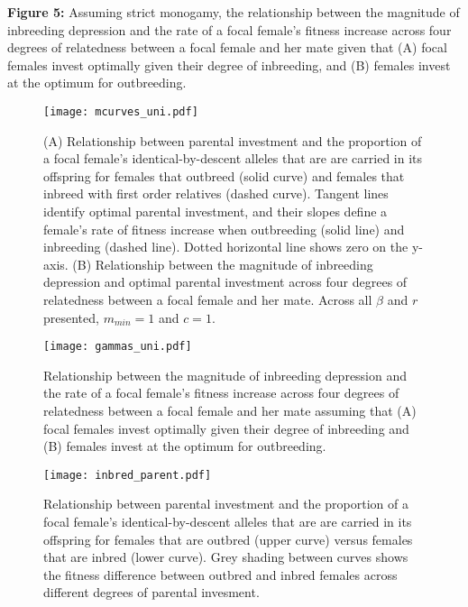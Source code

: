 \documentclass[12pt]{article}
\begin{document}
\noindent \textbf{Figure 5:} Assuming strict monogamy, the relationship between the magnitude of inbreeding depression and the rate of a focal female's fitness increase across four degrees of relatedness between a focal female and her mate given that (A) focal females invest optimally given their degree of inbreeding, and (B) females invest at the optimum for outbreeding. \\


\clearpage
\begin{figure}
\begin{center}				
\texttt{[image: mcurves\_uni.pdf]}
\end{center}
\caption{(A) Relationship between parental investment and the proportion of a focal female's identical-by-descent alleles that are are carried in its offspring for females that outbreed (solid curve) and females that inbreed with first order relatives (dashed curve). Tangent lines identify optimal parental investment, and their slopes define a female's rate of fitness increase when outbreeding (solid line) and inbreeding (dashed line). Dotted horizontal line shows zero on the y-axis. (B) Relationship between the magnitude of inbreeding depression and optimal parental investment across four degrees of relatedness between a focal female and her mate. Across all $\beta$ and $r$ presented, $m_{min}=1$ and $c=1$.}
\label{mcurves_uni}
\end{figure}


\clearpage
\begin{figure}
\begin{center}				
\texttt{[image: gammas\_uni.pdf]}
\end{center}
\caption{Relationship between the magnitude of inbreeding depression and the rate of a focal female's fitness increase across four degrees of relatedness between a focal female and her mate assuming that (A) focal females invest optimally given their degree of inbreeding and (B) females invest at the optimum for outbreeding.}
\label{gammas_uni}
\end{figure}


\clearpage
\begin{figure}
\begin{center}				
\texttt{[image: inbred\_parent.pdf]}
\end{center}
\caption{Relationship between parental investment and the proportion of a focal female's identical-by-descent alleles that are are carried in its offspring for females that are outbred (upper curve) versus females that are inbred (lower curve). Grey shading between curves shows the fitness difference between outbred and inbred females across different degrees of parental invesment.}
\label{inbred_parent}
\end{figure}
\end{document}
